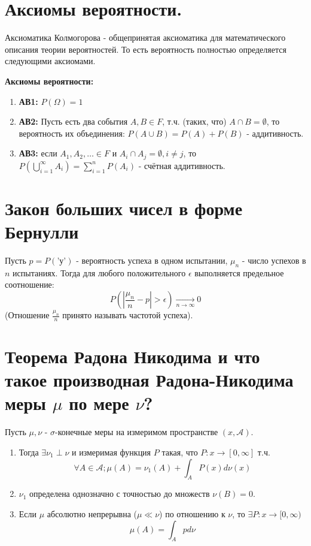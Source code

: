 \section{Аксиомы вероятности.}

Аксиоматика Колмогорова - общепринятая аксиоматика для математического описания теории вероятностей. То есть вероятность полностью определяется следующими аксиомами.

\textbf{Аксиомы вероятности:}
\begin{enumerate}
	\item \textbf{АВ1:} $P(\Omega) = 1$
	\item \textbf{АВ2:} Пусть есть два события $A, B \in F$, т.ч. (таких, что) $A \cap B = \emptyset$, то вероятность их объединения: $P(A \cup B) = P(A) + P(B)$ - аддитивность.
	\item \textbf{АВ3:} если $A_1, A_2, \dots \in F \text{ и } A_i \cap A_j = \emptyset, i \ne j$, то $P \left(\bigcup\limits_{i=1}^{\infty}A_i \right) = \sum\limits_{i=1}^{n}P(A_i)$ - счётная аддитивность.
\end{enumerate}

\section{Закон больших чисел в форме Бернулли}

Пусть $p = P(\text{'у'})$ - вероятность успеха в одном испытании, $\mu_n$ - число успехов в $n$ испытаниях. Тогда для любого положительного $\epsilon$ выполняется предельное соотношение:
\[ P \left( \left| \frac{\mu_n}{n} - p \right| > \epsilon \right) \underset{n \to \infty}{\to} 0 \]
(Отношение $\frac{\mu_n}{n}$ принято называть частотой успеха).

\section{Теорема Радона Никодима и что такое производная Радона-Никодима меры $\mu$ по мере $\nu$?}

Пусть $\mu, \nu$ - $\sigma$-конечные меры на измеримом пространстве $(x, \mathcal{A})$.
\begin{enumerate}
	\item Тогда $\exists \nu_1 \perp \nu$ и измеримая функция $P$ такая, что $P: x \to [0, \infty]$ т.ч.
	\[  \forall A \in \mathcal{A}; \mu(A) = \nu_1 (A) + \int_A P (x) d \nu (x)  \]
	\item $\nu_1$ определена однозначно с точностью до множеств $\nu (B) = 0$.
	\item Если $\mu$ абсолютно непрерывна ($\mu \ll \nu$) по отношению к $\nu$, то $\exists P: x \to [0, \infty)$
	\[ \mu (A) = \int_A p d \nu \]
\end{enumerate}

